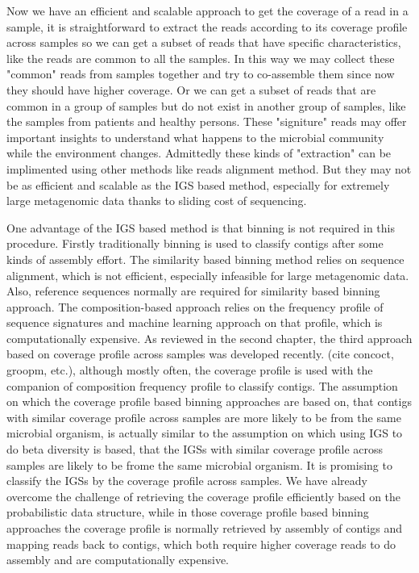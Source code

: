 Now we have an efficient and scalable approach to get the coverage of a read in
a sample, it is straightforward to extract the reads according to its coverage
profile across samples so we can get a subset of reads that have specific
characteristics, like the reads are common to all the samples. In this way we
may collect these "common" reads from samples together and try to co-assemble
them since now they should have higher coverage. Or we can get a subset of
reads that are common in a group of samples but do not exist in another group
of samples, like the samples from patients and healthy persons. These
"signiture" reads may offer important insights to understand what happens
to the microbial community while the environment changes. Admittedly these
kinds of "extraction" can be implimented using other methods like reads 
alignment method. But they may not be as efficient and scalable as the IGS
based method, especially for extremely large metagenomic data thanks to sliding
cost of sequencing.


One advantage of the IGS based method is that binning is not required in this
procedure. Firstly traditionally binning is used to classify contigs after some
kinds of assembly effort. The similarity based binning method relies on
sequence alignment, which is not efficient, especially infeasible for large
metagenomic data. Also, reference sequences normally are required for
similarity based binning approach. The composition-based approach relies on the
frequency profile of sequence signatures and machine learning approach on that
profile, which is computationally expensive. As reviewed in the second chapter,
the third approach based on coverage profile across samples was developed
recently. (cite concoct, groopm, etc.), although mostly often, the coverage
profile is used with the companion of composition frequency profile to classify
contigs. The assumption on which the coverage profile based binning approaches
are based on, that contigs with similar coverage profile across samples are
more likely to be from the same microbial organism, is actually similar to the
assumption on which using IGS to do beta diversity is based, that the IGSs with
similar coverage profile across samples are likely to be frome the same
microbial organism. It is promising to classify the IGSs by the coverage
profile across samples. We have already overcome the challenge of retrieving the
coverage profile efficiently based on the probabilistic data structure, while
in those coverage profile based binning approaches the coverage profile is 
normally retrieved by assembly of contigs and mapping
reads back to contigs, which both require higher coverage reads to do assembly
and are computationally expensive. 

